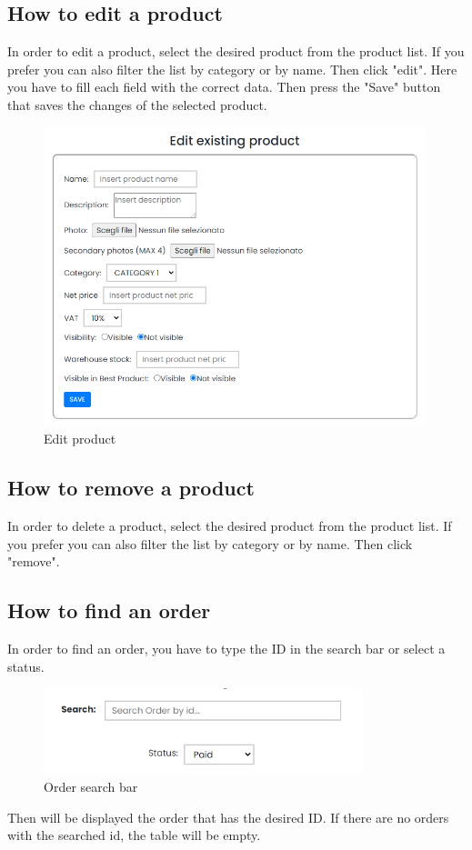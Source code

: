 \subsection{How to edit a product}\label{_editProduct}
In order to edit a product, select the desired product from the product list. If you prefer you can also filter the list by category or by name. Then click "edit".
Here you have to fill each field with the correct data. Then press the "Save" button that saves the changes of the selected product.
\begin{figure}[H]
    \centering
    \includegraphics[width=30em]{res/images/venditore/editproduct.png}
    \caption{Edit product}
\end{figure}

\subsection{How to remove a product}\label{_removeProduct}
In order to delete a product, select the desired product from the product list. If you prefer you can also filter the list by category or by name. Then click "remove".

\subsection{How to find an order}\label{_findOrder}
In order to find an order, you have to type the ID in the search bar or select a status.
\begin{figure}[H]
    \centering
    \includegraphics[width=25em]{res/images/venditore/orderbar.png}
    \caption{Order search bar}
\end{figure}
Then will be displayed the order that has the desired ID. If there are no orders with the searched id, the table will be empty.

